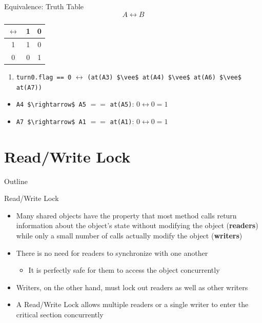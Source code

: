 \begin{frame}{Equivalence: Truth Table}
  $$A \leftrightarrow B$$


  \begin{center}
    \begin{tabular}{|c|c c|}
      \hline
      $\leftrightarrow$ & 1 & 0 \\\hline
      1 & 1 & 0 \\
      0 & 0 & 1 \\\hline
    \end{tabular}
  \end{center}


  \begin{enumerate}
  \item \lstinline!turn0.flag == 0! $\leftrightarrow$ 
    \lstinline!(at(A3) $\vee$ at(A4) $\vee$ at(A6) $\vee$ at(A7))!
  \end{enumerate}


  \begin{itemize}  
  \item \lstinline!A4 $\rightarrow$ A5! $==$ \lstinline!at(A5)!: $0
    \leftrightarrow 0 = 1$
  \item \lstinline!A7 $\rightarrow$ A1! $==$ \lstinline!at(A1)!: $0
    \leftrightarrow 0 = 1$
  \end{itemize}
\end{frame}


\section{Read/Write Lock}

\begin{frame}{Outline}
  \tableofcontents[current]
\end{frame}

\begin{frame}{Read/Write Lock}
  \begin{itemize}
  \item Many shared objects have the property that most method calls
    return information about the object's state without modifying the
    object ({\bf readers}) while only a small number of calls actually
    modify the object ({\bf writers})
  \item There is no need for readers to synchronize with one another
    \begin{itemize}
    \item It is perfectly safe for them to access the object
      concurrently
    \end{itemize}
  \item Writers, on the other hand, must lock out readers as well as
    other writers
  \item A Read/Write Lock allows multiple readers or a single
    writer to enter the critical section concurrently
  \end{itemize}
\end{frame}

